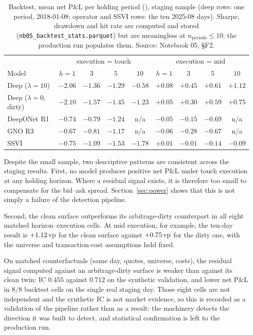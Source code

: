 \begin{table}[htbp]\centering\small
\caption{Backtest, mean net P\&L per holding period (\vp), staging sample (deep rows:
one period, 2018-01-08; operator and SSVI rows: the ten 2025-08 days). Sharpe, drawdown and hit
rate are computed and stored (\texttt{nb05\_backtest\_stats.parquet}) but are meaningless at
$n_{\mathrm{periods}}\le10$; the production run populates them.
Source: Notebook 05, \S F2.}
\label{tab:f2}
\begin{tabular}{lcccc@{\qquad}cccc}
\toprule
 & \multicolumn{4}{c}{execution = touch} & \multicolumn{4}{c}{execution = mid} \\
Model & $h{=}1$ & $3$ & $5$ & $10$ & $h{=}1$ & $3$ & $5$ & $10$ \\
\midrule
Deep ($\lambda{=}10$) & $-2.06$ & $-1.36$ & $-1.29$ & $-0.58$ & $+0.08$ & $+0.45$ & $+0.61$ & $+1.12$ \\
Deep ($\lambda{=}0$, dirty) & $-2.10$ & $-1.57$ & $-1.45$ & $-1.23$ & $+0.05$ & $+0.30$ & $+0.59$ & $+0.75$ \\
DeepONet R1 & $-0.74$ & $-0.79$ & $-1.24$ & n/a & $-0.05$ & $-0.15$ & $-0.69$ & n/a \\
GNO R3 & $-0.67$ & $-0.81$ & $-1.17$ & n/a & $-0.06$ & $-0.28$ & $-0.67$ & n/a \\
SSVI & $-0.75$ & $-1.09$ & $-1.53$ & $-1.78$ & $+0.01$ & $-0.01$ & $-0.14$ & $-0.09$ \\
\bottomrule
\end{tabular}
\end{table}

Despite the small sample, two descriptive patterns are consistent across the staging results.
First, no model produces positive net P\&L under touch execution at any holding horizon. Where a
residual signal exists, it is therefore too small to compensate for the bid--ask spread.
Section~\ref{sec:power} shows that this is not simply a failure of the detection pipeline.

Second, the clean surface outperforms its arbitrage-dirty counterpart in all eight matched
horizon--execution cells. At mid execution, for example, the ten-day result is $+1.12\,\text{vp}$ for
the clean surface against $+0.75\,\text{vp}$ for the dirty one, with the universe and
transaction-cost assumptions held fixed.

\begin{finding}
\label{find:economics}
On matched counterfactuals (same day, quotes, universe, costs), the residual signal computed
against an arbitrage-dirty surface is weaker than against its clean twin: IC $0.455$ against
$0.712$ on the synthetic validation, and lower net P\&L in $8/8$ backtest cells on the single
real staging day. Those eight cells are not independent and the synthetic IC is not market
evidence, so this is recorded as a validation of the pipeline rather than as a result: the
machinery detects the direction it was built to detect, and statistical confirmation is left to
the production run.
\end{finding}

